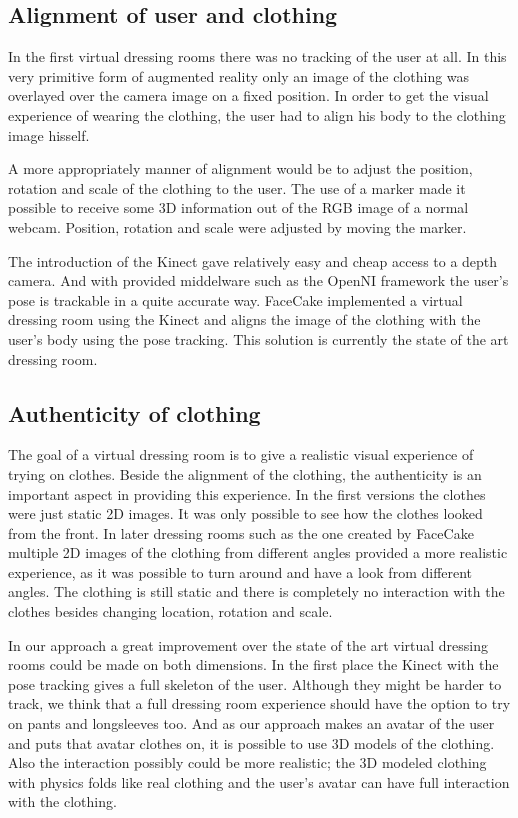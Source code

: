 \documentclass[a4paper]{article}
\begin{document}
\subsection{Alignment of user and clothing}

In the first virtual dressing rooms there was no tracking of the user at all. In this very primitive form of augmented reality only an image of the clothing was overlayed over the camera image on a fixed position. In order to get the visual experience of wearing the clothing, the user had to align his body to the clothing image hisself. 


A more appropriately manner of alignment would be to adjust the position, rotation and scale of the clothing to the user. The use of a marker made it possible to receive some 3D information out of the RGB image of a normal webcam. Position, rotation and scale were adjusted by moving the marker.


The introduction of the Kinect gave relatively easy and cheap access to a depth camera. And with provided middelware such as the OpenNI framework the user's pose is trackable in a quite accurate way. FaceCake implemented a virtual dressing room using the Kinect and aligns the image of the clothing with the user's body using the pose tracking. This solution is currently the state of the art dressing room.


\subsection{Authenticity of clothing}

The goal of a virtual dressing room is to give a realistic visual experience of trying on clothes. Beside the alignment of the clothing, the authenticity is an important aspect in providing this experience. In the first versions the clothes were just static 2D images. It was only possible to see how the clothes looked from the front. In later dressing rooms such as the one created by FaceCake multiple 2D images of the clothing from different angles provided a more realistic experience, as it was possible to turn around and have a look from different angles. The clothing is still static and there is completely no interaction with the clothes besides changing location, rotation and scale.

In our approach a great improvement over the state of the art virtual dressing rooms could be made on both dimensions. In the first place the Kinect with the pose tracking gives a full skeleton of the user. Although they might be harder to track, we think that a full dressing room experience should have the option to try on pants and longsleeves too. And as our approach makes an avatar of the user and puts that avatar clothes on, it is possible to use 3D models of the clothing. Also the interaction possibly could be more realistic; the 3D modeled clothing with physics folds like real clothing and the user's avatar can have full interaction with the clothing.
\end{document}
